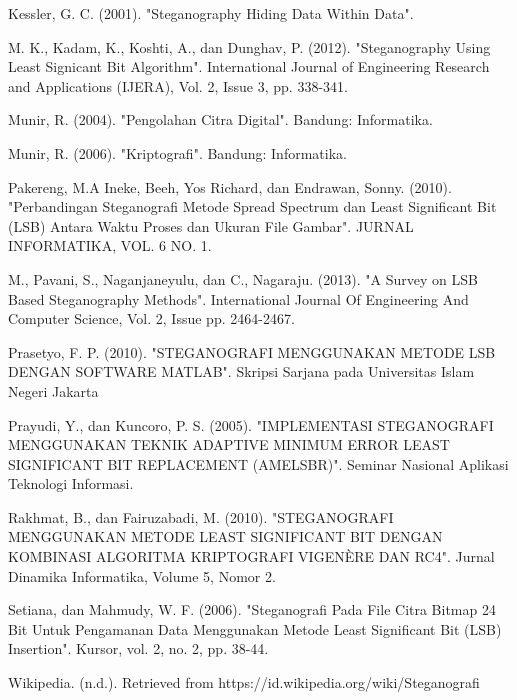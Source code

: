 \documentclass{jtetiskripsi}
\begin{document}
\begin{thebibliography}{99}
	Kessler, G. C. (2001). "Steganography Hiding Data Within Data".
	
	M. K., Kadam, K., Koshti, A., dan Dunghav, P. (2012). "Steganography Using Least Signicant Bit Algorithm". International Journal of Engineering Research and Applications (IJERA), Vol. 2, Issue 3, pp. 338-341.
	
	Munir, R. (2004). "Pengolahan Citra Digital". Bandung: Informatika.
	
	Munir, R. (2006). "Kriptografi". Bandung: Informatika.
	
	Pakereng, M.A Ineke, Beeh, Yos Richard, dan Endrawan, Sonny. (2010). "Perbandingan Steganografi Metode Spread Spectrum dan Least Significant Bit (LSB) Antara Waktu Proses dan Ukuran File Gambar". JURNAL INFORMATIKA, VOL. 6 NO. 1.
	
	M., Pavani, S., Naganjaneyulu, dan C., Nagaraju. (2013). "A Survey on LSB Based Steganography Methods". International Journal Of Engineering And Computer Science, Vol. 2, Issue pp. 2464-2467.
	
	Prasetyo, F. P. (2010). "STEGANOGRAFI MENGGUNAKAN METODE LSB DENGAN SOFTWARE MATLAB". Skripsi Sarjana pada Universitas Islam Negeri Jakarta
	
	Prayudi, Y., dan Kuncoro, P. S. (2005). "IMPLEMENTASI STEGANOGRAFI MENGGUNAKAN TEKNIK ADAPTIVE MINIMUM ERROR LEAST SIGNIFICANT BIT REPLACEMENT (AMELSBR)". Seminar Nasional Aplikasi Teknologi Informasi.
	
	Rakhmat, B., dan Fairuzabadi, M. (2010). "STEGANOGRAFI MENGGUNAKAN METODE LEAST SIGNIFICANT BIT DENGAN KOMBINASI ALGORITMA KRIPTOGRAFI VIGENÈRE DAN RC4". Jurnal Dinamika Informatika, Volume 5, Nomor 2.
	
	Setiana, dan Mahmudy, W. F. (2006). "Steganografi Pada File Citra Bitmap 24 Bit Untuk Pengamanan Data Menggunakan Metode Least Significant Bit (LSB) Insertion". Kursor, vol. 2, no. 2, pp. 38-44.
	
	Wikipedia. (n.d.). Retrieved from https://id.wikipedia.org/wiki/Steganografi
		
		
	
\end{thebibliography}

%

%
\end{document}
